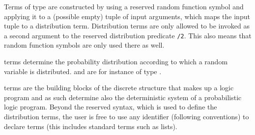 \begin{definition}
	Terms of type  are constructed by using a reserved random function symbol and applying it to a (possible empty) tuple of input arguments, which maps the input tuple to a distribution term.
	Distribution terms are only allowed to be invoked as a second argument to the reserved distribution predicate \probloginline{~}\lstinline[columns=fixed]|/2|.
	This also means that random function symbols are only used there as well. 
\end{definition}

 terms determine the probability distribution according to which a random variable is distributed.
 and  are for instance of type .



\begin{definition}
   terms are the building blocks of the discrete structure that makes up a logic program and as such determine also the deterministic system of a probabilistic logic program. Beyond the reserved syntax, which is used to define the distribution terms, the user is free to use any identifier (following \prologsty conventions) to declare  terms (this includes standard \prologsty terms such as lists).  
\end{definition}


